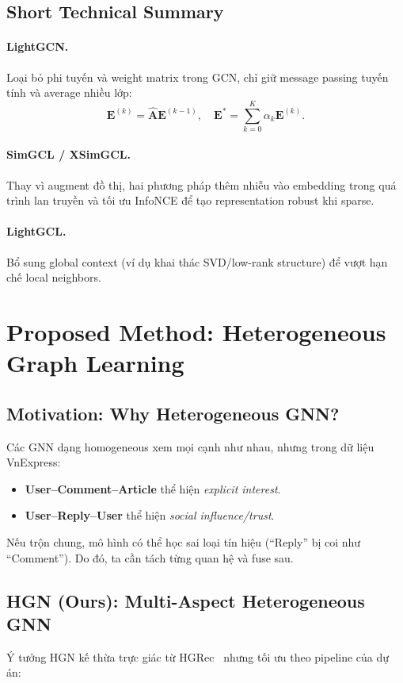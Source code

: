 \documentclass[11pt]{article}
\begin{document}
\subsection{Short Technical Summary}
\paragraph{LightGCN.}
Loại bỏ phi tuyến và weight matrix trong GCN, chỉ giữ message passing tuyến tính và average nhiều lớp:
\[
\mathbf{E}^{(k)} = \hat{\mathbf{A}} \mathbf{E}^{(k-1)}, \quad
\mathbf{E}^{*}=\sum_{k=0}^{K}\alpha_k \mathbf{E}^{(k)}.
\]

\paragraph{SimGCL / XSimGCL.}
Thay vì augment đồ thị, hai phương pháp thêm nhiễu vào embedding trong quá trình lan truyền và tối ưu InfoNCE để tạo representation robust khi sparse.

\paragraph{LightGCL.}
Bổ sung global context (ví dụ khai thác SVD/low-rank structure) để vượt hạn chế local neighbors.

\section{Proposed Method: Heterogeneous Graph Learning}
\label{sec:method}

\subsection{Motivation: Why Heterogeneous GNN?}
Các GNN dạng homogeneous xem mọi cạnh như nhau, nhưng trong dữ liệu VnExpress:
\begin{itemize}
  \item \textbf{User--Comment--Article} thể hiện \emph{explicit interest}.
  \item \textbf{User--Reply--User} thể hiện \emph{social influence/trust}.
\end{itemize}
Nếu trộn chung, mô hình có thể học sai loại tín hiệu (``Reply'' bị coi như ``Comment''). Do đó, ta cần tách từng quan hệ và fuse sau.

\subsection{HGN (Ours): Multi-Aspect Heterogeneous GNN}
Ý tưởng HGN kế thừa trực giác từ HGRec~\cite{shi2020hgrec} nhưng tối ưu theo pipeline của dự án:
\end{document}
